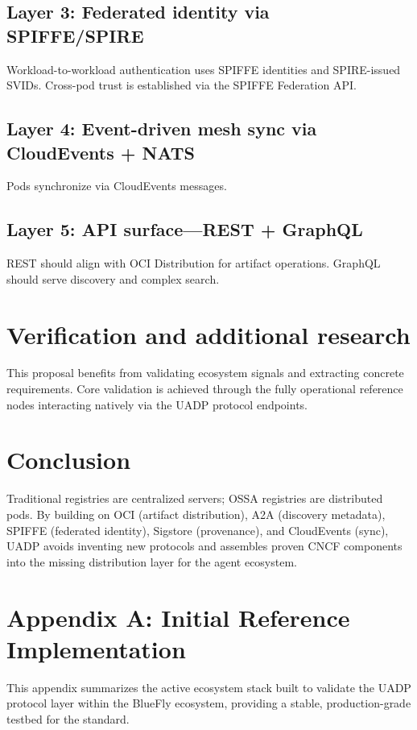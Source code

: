 \documentclass[11pt]{article}
\begin{document}
\subsection{Layer 3: Federated identity via SPIFFE/SPIRE}
Workload-to-workload authentication uses SPIFFE identities and SPIRE-issued SVIDs. Cross-pod trust is established via the SPIFFE Federation API.

\subsection{Layer 4: Event-driven mesh sync via CloudEvents + NATS}
Pods synchronize via CloudEvents messages.

\subsection{Layer 5: API surface---REST + GraphQL}
REST should align with OCI Distribution for artifact operations. GraphQL should serve discovery and complex search.

\section{Verification and additional research}
This proposal benefits from validating ecosystem signals and extracting concrete requirements. Core validation is achieved through the fully operational reference nodes interacting natively via the UADP protocol endpoints.

\section{Conclusion}
Traditional registries are centralized servers; OSSA registries are distributed pods. By building on OCI (artifact distribution), A2A (discovery metadata), SPIFFE (federated identity), Sigstore (provenance), and CloudEvents (sync), UADP avoids inventing new protocols and assembles proven CNCF components into the missing distribution layer for the agent ecosystem.

\appendix
\section{Appendix A: Initial Reference Implementation}
This appendix summarizes the active ecosystem stack built to validate the UADP protocol layer within the BlueFly ecosystem, providing a stable, production-grade testbed for the standard.
\end{document}

